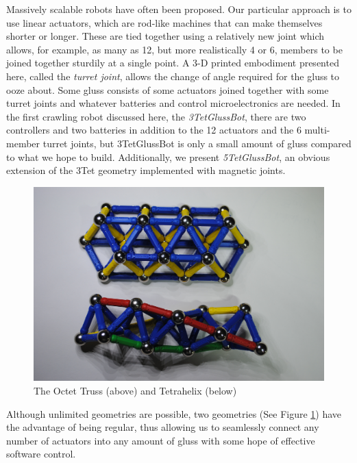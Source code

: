 \documentclass[11pt]{article}
\begin{document}
Massively scalable robots have often been proposed. Our particular approach is to use linear actuators,
which are rod-like machines that can make themselves shorter or longer. These are tied together using
a relatively new joint \cite{song2003spherical} which allows, for example, as many as 12, but more realistically 4 or 6,
members to be joined together sturdily at a single point.
A 3-D printed embodiment presented here, called the \emph{turret joint}, allows the
change of angle required for the gluss to ooze about. Some gluss consists of some actuators joined together
with some turret joints and whatever batteries and control microelectronics are needed. In the first
crawling robot discussed here, the \emph{3TetGlussBot}, there are two controllers and two batteries
in addition to the 12 actuators and the 6 multi-member turret joints, but 3TetGlussBot is only
a small amount of gluss compared to what we hope to build. Additionally, we present \emph{5TetGlussBot}, an obvious extension of the
3Tet geometry implemented with magnetic joints.

\begin{figure}[H]
  \centering
    \includegraphics[width=1.0\textwidth]{figures/TwoGeometries.jpg}
    \caption[The Octet Truss (above) and Tetrahelix (below)]{The Octet Truss (above) and Tetrahelix (below)}
      \label{twogeometries}
\end{figure}


Although unlimited geometries are possible, two geometries (See Figure \ref{twogeometries}) 
have the advantage of being regular, thus allowing us to
seamlessly connect any number of actuators into any amount of gluss with some hope of effective software control.
\end{document}
